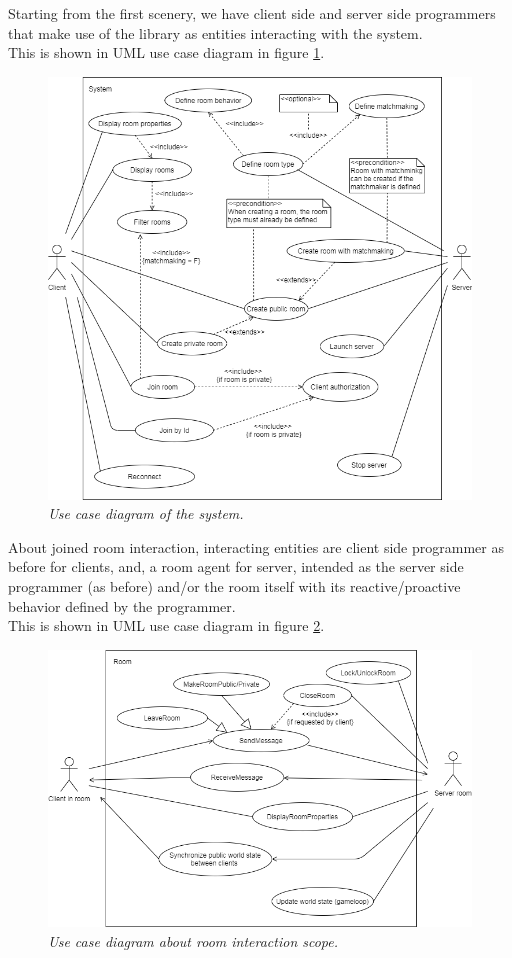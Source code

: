 \bigskip
Starting from the first scenery, we have client side and server side programmers that make use of the library as entities interacting with the system.
\\
This is shown in UML use case diagram in figure \ref{fig:system-use_cases}.
\begin{figure}[H]
  \includegraphics[scale=0.5]{images/2-scoping/system-use_cases.png}
   \centering  
   \caption{\textit{Use case diagram of the system.}}
  \label{fig:system-use_cases}
\end{figure}

\bigskip
About joined room interaction, interacting entities are client side programmer as before for clients, and, a room agent for server, intended as the server side programmer (as before) and/or the room itself with its reactive/proactive behavior defined by the programmer. 
\\
This is shown in UML use case diagram in figure \ref{fig:room-use_cases}.
\begin{figure}[H]
  \includegraphics[scale=0.5]{images/2-scoping/room-use_cases.png}
   \centering  
   \caption{\textit{Use case diagram about room interaction scope.}}
  \label{fig:room-use_cases}
\end{figure} 
 
